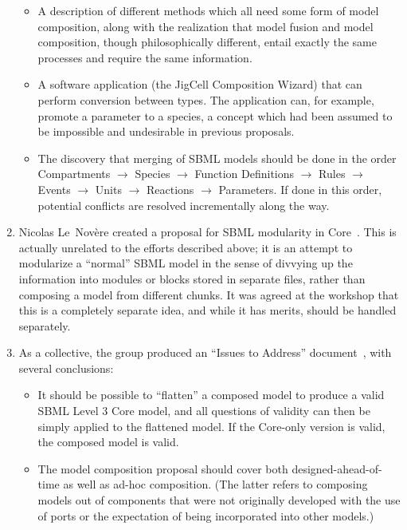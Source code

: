 \begin{enumerate}
  \begin{itemize}

  \item A description of different methods which all need some form of
    model composition, along with the realization that model fusion
    and model composition, though philosophically different, entail
    exactly the same processes and require the same information.

  \item A software application (the JigCell Composition Wizard) that
    can perform conversion between types.  The application can, for
    example, promote a parameter to a species, a concept which had
    been assumed to be impossible and undesirable in previous
    proposals.  

  \item The discovery that merging of SBML models should be done in
    the order Compartments $\rightarrow$ Species  $\rightarrow$
    Function Definitions  $\rightarrow$ Rules  $\rightarrow$ Events
    $\rightarrow$ Units  $\rightarrow$ Reactions  $\rightarrow$
    Parameters.  If done in this order, potential conflicts are
    resolved incrementally along the way.

  \end{itemize}

\item Nicolas Le~Nov\`{e}re created a proposal for SBML modularity in
  Core~\citep{lenov:2007}.  This is actually unrelated to the efforts
  described above; it is an attempt to modularize a ``normal'' SBML
  model in the sense of divvying up the information into modules or
  blocks stored in separate files, rather than composing a model from
  different chunks.  It was agreed at the workshop that this is a
  completely separate idea, and while it has merits, should be handled
  separately.

\item As a collective, the group produced an ``Issues to Address''
  document~\citep{various:2007}, with several conclusions:

  \begin{itemize}

  \item It should be possible to ``flatten'' a composed model to
    produce a valid SBML Level 3 Core model, and all questions of
    validity can then be simply applied to the flattened model.  If
    the Core-only version is valid, the composed model is valid.

  \item The model composition proposal should cover both
    designed-ahead-of-time as well as ad-hoc composition. (The latter
    refers to composing models out of components that were not
    originally developed with the use of ports or the expectation of
    being incorporated into other models.)


\end{itemize}
\end{enumerate}
